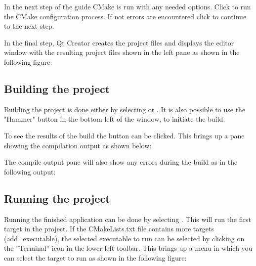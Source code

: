 
In the next step of the guide CMake is run with any needed options. Click  to run the CMake configuration process. If not errors are encountered click  to continue to the next step.


In the final step, Qt Creator creates the project files and displays the editor window with the resulting project files shown in the left pane as shown in the following figure:


\subsection{Building the project}

Building the project is done either by selecting  or . It is also possible to use the "Hammer" button in the bottom left of the window, to initiate the build. 

To see the results of the build the button  can be clicked. This brings up a pane showing the compilation output as shown below:


The compile output pane will also show any errors during the build as in the following output:


\subsection{Running the project}

Running the finished application can be done by selecting . This will run the first target in the project. If the CMakeLists.txt file contains more targets (add\_executable), the selected executable to run can be selected by clicking on the ''Terminal'' icon in the lower left toolbar. This brings up a menu in which you can select the target to run as shown in the following figure:




